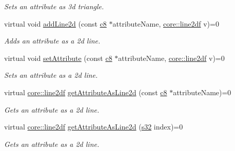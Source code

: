 \begin{DoxyCompactItemize}
\begin{DoxyCompactList}\small\item\em Sets an attribute as 3d triangle. \end{DoxyCompactList}\item 
\mbox{\label{classirr_1_1io_1_1IAttributes_abf98be37e1be44dfde1f5a34c2e31240}} 
virtual void \hyperlink{classirr_1_1io_1_1IAttributes_abf98be37e1be44dfde1f5a34c2e31240}{add\+Line2d} (const \hyperlink{namespaceirr_a9395eaea339bcb546b319e9c96bf7410}{c8} $\ast$attribute\+Name, \hyperlink{namespaceirr_1_1core_a19bbe2f8741053a37be916e9ea42e456}{core\+::line2df} v)=0
\begin{DoxyCompactList}\small\item\em Adds an attribute as a 2d line. \end{DoxyCompactList}\item 
\mbox{\label{classirr_1_1io_1_1IAttributes_aedfdad4b7196cb04dc45c9b4ab5a15f5}} 
virtual void \hyperlink{classirr_1_1io_1_1IAttributes_aedfdad4b7196cb04dc45c9b4ab5a15f5}{set\+Attribute} (const \hyperlink{namespaceirr_a9395eaea339bcb546b319e9c96bf7410}{c8} $\ast$attribute\+Name, \hyperlink{namespaceirr_1_1core_a19bbe2f8741053a37be916e9ea42e456}{core\+::line2df} v)=0
\begin{DoxyCompactList}\small\item\em Sets an attribute as a 2d line. \end{DoxyCompactList}\item 
virtual \hyperlink{namespaceirr_1_1core_a19bbe2f8741053a37be916e9ea42e456}{core\+::line2df} \hyperlink{classirr_1_1io_1_1IAttributes_ace0d40cce5fad56cbe030d63c5743854}{get\+Attribute\+As\+Line2d} (const \hyperlink{namespaceirr_a9395eaea339bcb546b319e9c96bf7410}{c8} $\ast$attribute\+Name)=0
\begin{DoxyCompactList}\small\item\em Gets an attribute as a 2d line. \end{DoxyCompactList}\item 
virtual \hyperlink{namespaceirr_1_1core_a19bbe2f8741053a37be916e9ea42e456}{core\+::line2df} \hyperlink{classirr_1_1io_1_1IAttributes_aa03235ad3ff3eb4468c424c171ee652f}{get\+Attribute\+As\+Line2d} (\hyperlink{namespaceirr_ac66849b7a6ed16e30ebede579f9b47c6}{s32} index)=0
\begin{DoxyCompactList}\small\item\em Gets an attribute as a 2d line. \end{DoxyCompactList}\item 

\end{DoxyCompactItemize}
